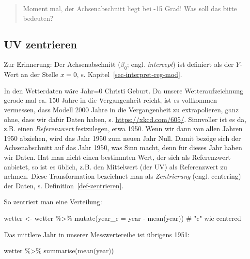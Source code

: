 \documentclass[
  letterpaper,
  twoside,
  open=any]{scrbook}
\newenvironment{Shaded}{\begin{snugshade}}{\end{snugshade}}
\newcommand{\AttributeTok}[1]{\textcolor[rgb]{0.40,0.45,0.13}{#1}}
\newcommand{\CommentTok}[1]{\textcolor[rgb]{0.37,0.37,0.37}{#1}}
\newcommand{\FunctionTok}[1]{\textcolor[rgb]{0.28,0.35,0.67}{#1}}
\newcommand{\NormalTok}[1]{\textcolor[rgb]{0.00,0.23,0.31}{#1}}
\newcommand{\OtherTok}[1]{\textcolor[rgb]{0.00,0.23,0.31}{#1}}
\newcommand{\SpecialCharTok}[1]{\textcolor[rgb]{0.37,0.37,0.37}{#1}}
\theoremstyle{definition}
\theoremstyle{definition}
\theoremstyle{definition}
\theoremstyle{remark}
\begin{document}
\begin{quote}
{} Moment mal, der Achsenabschnitt liegt bei -15 Grad!
Was soll das bitte bedeuten?
\end{quote}

\subsection{UV zentrieren}\label{uv-zentrieren}

Zur Erinnerung: Der Achsenabschnitt (\(\beta_0\); engl.
\emph{intercept}) ist definiert als der \(Y\)-Wert an der Stelle
\(x=0\), s. Kapitel~\ref{sec-interpret-reg-mod}.

In den Wetterdaten wäre Jahr=0 Christi Geburt. Da unsere
Wetteraufzeichnung gerade mal ca. 150 Jahre in die Vergangenheit reicht,
ist es vollkommen vermessen, dass Modell 2000 Jahre in die Vergangenheit
zu extrapolieren, ganz ohne, dass wir dafür Daten haben, s.
\url{https://xkcd.com/605/}. Sinnvoller ist es da, z.B. einen
\emph{Referenzwert} festzulegen, etwa 1950. Wenn wir dann von allen
Jahren 1950 abziehen, wird das Jahr 1950 zum neuen Jahr Null. Damit
bezöge sich der Achsenabschnitt auf das Jahr 1950, was Sinn macht, denn
für dieses Jahr haben wir Daten. Hat man nicht einen bestimmten Wert,
der sich als Referenzwert anbietet, so ist es üblich, z.B. den
Mittelwert (der UV) als Referenzwert zu nehmen. Diese Transformation
bezeichnet man als \emph{Zentrierung} (engl. centering) der Daten, s.
Definition~\ref{def-zentrieren}.

So zentriert man eine Verteilung:

\begin{Shaded}
\begin{Highlighting}[]
\NormalTok{wetter }\OtherTok{\textless{}{-}}
\NormalTok{  wetter }\SpecialCharTok{\%\textgreater{}\%} 
  \FunctionTok{mutate}\NormalTok{(}\AttributeTok{year\_c =}\NormalTok{ year }\SpecialCharTok{{-}} \FunctionTok{mean}\NormalTok{(year))  }\CommentTok{\# "c" wie centered}
\end{Highlighting}
\end{Shaded}

Das mittlere Jahr in unserer Messwertereihe ist übrigens 1951:

\begin{Shaded}
\begin{Highlighting}[]
\NormalTok{wetter }\SpecialCharTok{\%\textgreater{}\%} 
  \FunctionTok{summarise}\NormalTok{(}\FunctionTok{mean}\NormalTok{(year))}
\end{Highlighting}
\end{Shaded}
\end{document}
